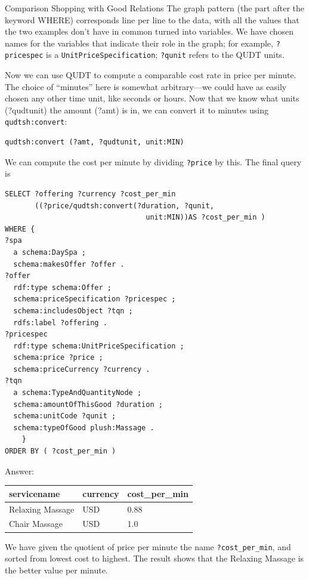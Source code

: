 \begin{challenge}{Comparison Shopping with Good Relations}
The graph pattern (the part after the keyword WHERE) corresponds line
per line to the data, with all the values that the two examples don't
have in common turned into variables. We have chosen names for the
variables that indicate their role in the graph; for example, \texttt{?pricespec}
is a \texttt{UnitPriceSpecification}; \texttt{?qunit} refers to the QUDT units.

Now we can use QUDT to compute a comparable cost rate in price per
minute. The choice of ``minutes'' here is somewhat arbitrary---we could
have as easily chosen any other time unit, like seconds or hours. Now
that we know what units (?qudtunit) the amount (?amt) is in, we can
convert it to minutes using \texttt{qudtsh:convert}:

\begin{lstlisting}
qudtsh:convert (?amt, ?qudtunit, unit:MIN)
\end{lstlisting}

We can compute the cost per minute by dividing \texttt{?price} by this. The final
query is

\begin{lstlisting}
SELECT ?offering ?currency ?cost_per_min
       ((?price/qudtsh:convert(?duration, ?qunit,
                                 unit:MIN))AS ?cost_per_min )
WHERE {
?spa
  a schema:DaySpa ;
  schema:makesOffer ?offer .
?offer
  rdf:type schema:Offer ;
  schema:priceSpecification ?pricespec ;
  schema:includesObject ?tqn ;
  rdfs:label ?offering .
?pricespec
  rdf:type schema:UnitPriceSpecification ;
  schema:price ?price ;
  schema:priceCurrency ?currency .
?tqn
  a schema:TypeAndQuantityNode ;
  schema:amountOfThisGood ?duration ;
  schema:unitCode ?qunit ;  
  schema:typeOfGood plush:Massage .
    }
ORDER BY ( ?cost_per_min )
\end{lstlisting}

Answer:

\begin{tabular}{|lll|}
\hline
servicename&currency&cost\_per\_min\\
\hline
Relaxing Massage&USD&0.88\\
Chair Massage&USD&1.0\\
\hline
\end{tabular}

We have given the quotient of price per minute the name \texttt{?cost\_per\_min},
and sorted from lowest cost to highest. The result shows that the
Relaxing Massage is the better value per minute.
\end{challenge}

